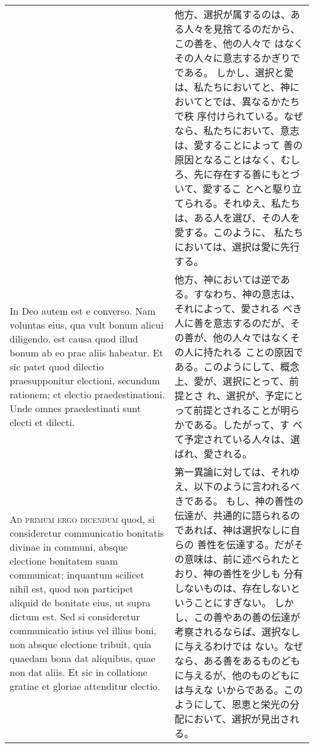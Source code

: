 \documentclass[10pt]{jsarticle} %
\begin{document}
\begin{longtable}{p{21em}p{21em}}
&

他方、選択が属するのは、ある人々を見捨てるのだから、この善を、他の人々で
 はなくその人々に意志するかぎりでである。
しかし、選択と愛は、私たちにおいてと、神においてとでは、異なるかたちで秩
 序付けられている。なぜなら、私たちにおいて、意志は、愛することによって
 善の原因となることはなく、むしろ、先に存在する善にもとづいて、愛するこ
 とへと駆り立てられる。それゆえ、私たちは、ある人を選び、その人を愛する。このように、
 私たちにおいては、選択は愛に先行する。


\\


In Deo autem
 est e converso. Nam voluntas eius, qua vult bonum alicui diligendo, est
 causa quod illud bonum ab eo prae aliis habeatur. Et sic patet quod
 dilectio praesupponitur electioni, secundum rationem; et electio
 praedestinationi. Unde omnes praedestinati sunt electi et dilecti.


&

他方、神においては逆である。すなわち、神の意志は、それによって、愛される
 べき人に善を意志するのだが、その善が、他の人々ではなくその人に持たれる
 ことの原因である。このようにして、概念上、愛が、選択にとって、前提とさ
 れ、選択が、予定にとって前提とされることが明らかである。したがって、す
 べて予定されている人々は、選ばれ、愛される。


\\



{\scshape Ad primum ergo dicendum} quod, si consideretur
 communicatio bonitatis divinae in communi, absque electione bonitatem
 suam communicat; inquantum scilicet nihil est, quod non participet
 aliquid de bonitate eius, ut supra dictum est. Sed si consideretur
 communicatio istius vel illius boni, non absque electione tribuit, quia
 quaedam bona dat aliquibus, quae non dat aliis. Et sic in collatione
 gratiae et gloriae attenditur electio.


&

第一異論に対しては、それゆえ、以下のように言われるべきである。
もし、神の善性の伝達が、共通的に語られるのであれば、神は選択なしに自らの
 善性を伝達する。だがその意味は、前に述べられたとおり、神の善性を少しも
分有しないものは、存在しないということにすぎない。
しかし、この善やあの善の伝達が考察されるならば、選択なしに与えるわけでは
 ない。なぜなら、ある善をあるものどもに与えるが、他のものどもには与えな
 いからである。このようにして、恩恵と栄光の分配において、選択が見出され
 る。


\\




\end{longtable}
\end{document}
